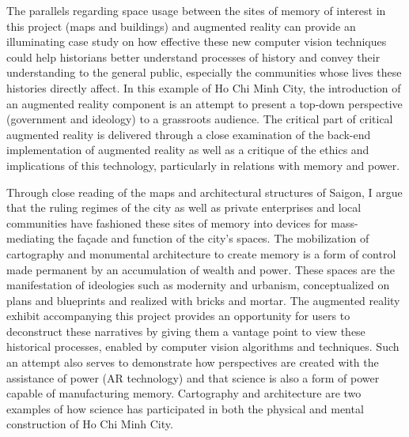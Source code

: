 The parallels regarding space usage between the sites of memory of interest in this project (maps and buildings) and augmented reality can provide an illuminating case study on how effective these new computer vision techniques could help historians better understand processes of history and convey their understanding to the general public, especially the communities whose lives these histories directly affect. In this example of Ho Chi Minh City, the introduction of an augmented reality component is an attempt to present a top-down perspective (government and ideology) to a grassroots audience. The critical part of critical augmented reality is delivered through a close examination of the back-end implementation of augmented reality as well as a critique of the ethics and implications of this technology, particularly in relations with memory and power.

Through close reading of the maps and architectural structures of Saigon, I argue that the ruling regimes of the city as well as private enterprises and local communities have fashioned these sites of memory into devices for mass-mediating the façade and function of the city’s spaces. The mobilization of cartography and monumental architecture to create memory is a form of control made permanent by an accumulation of wealth and power. These spaces are the manifestation of ideologies such as modernity and urbanism, conceptualized on plans and blueprints and realized with bricks and mortar. The augmented reality exhibit accompanying this project provides an opportunity for users to deconstruct these narratives by giving them a vantage point to view these historical processes, enabled by computer vision algorithms and techniques. Such an attempt also serves to demonstrate how perspectives are created with the assistance of power (AR technology) and that science is also a form of power capable of manufacturing memory. Cartography and architecture are two examples of how science has participated in both the physical and mental construction of Ho Chi Minh City.

